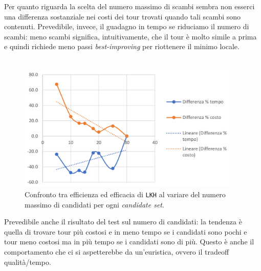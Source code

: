 Per quanto riguarda la scelta del numero massimo di scambi sembra non esserci una differenza 
sostanziale nei costi dei tour trovati quando tali scambi sono contenuti. Prevedibile, invece, 
il guadagno in tempo se riduciamo il numero di scambi: meno scambi significa, intuitivamente, che 
il tour è molto simile a prima e quindi richiede meno passi \textit{best-improving} per riottenere 
il minimo locale.
\ \\
\ \\

\begin{figure}[H]
    \centering
    \includegraphics[width=300pt]{img/GraficoCandidati.png}
    \caption{Confronto tra efficienza ed efficacia di \texttt{LKH} al variare del numero massimo 
                di candidati per ogni \textit{candidate set}.}
\end{figure}

Prevedibile anche il risultato del test sul numero di candidati: la tendenza è quella di trovare 
tour più costosi e in meno tempo se i candidati sono pochi e tour meno costosi ma in più tempo 
se i candidati sono di più. Questo è anche il comportamento che ci si aspetterebbe da 
un'euristica, ovvero il tradeoff qualità/tempo.